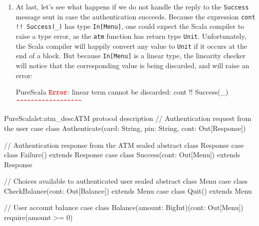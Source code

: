 \documentclass[a4paper,twoside]{article}
\newcommand{\stt}[1]{\texttt{\small{#1}}}
\begin{document}
\begin{enumerate}
\begin{ShortCode}{PureScala}
$\texttt{\textbf{\textcolor{Red}{Error}}}$: linear variable `cont` of $\texttt{type}$ `Linear[OutChan[Response]]` is never used:
                 case Authenticate(_, _, cont) =>
                                         $\texttt{\textbf{\textcolor{Red}{\textasciicircum\textasciicircum\textasciicircum\textasciicircum}}}$
\end{ShortCode}

\item
At last, let's see what happens if we do not handle the reply to the \stt{Success} message sent in case the authentication succeeds. Because the expression \stt{cont !! Success(\_)} has type \stt{In[Menu]}, one could expect the Scala compiler to raise a type error, as the \stt{atm} function has return type \stt{Unit}. Unfortunately, the Scala compiler will happily convert any value to \stt{Unit} if it occurs at the end of a block. But because \stt{In[Menu]} is a linear type, the linearity checker will notice that the corresponding value is being discarded, and will raise an error:

\begin{ShortCode}{PureScala}
$\texttt{\textbf{\textcolor{Red}{Error}}}$: linear term cannot be discarded: cont !! Success(_)
                                        $\texttt{\textbf{\textcolor{Red}{\textasciicircum\textasciicircum\textasciicircum\textasciicircum\textasciicircum\textasciicircum\textasciicircum\textasciicircum\textasciicircum\textasciicircum\textasciicircum\textasciicircum\textasciicircum\textasciicircum\textasciicircum\textasciicircum\textasciicircum\textasciicircum}}}$
\end{ShortCode}
\end{enumerate}

\begin{Code}{PureScala}{lst:atm_desc}{ATM protocol description}
// Authentication request from the user
case class Authenticate(card: String, pin: String, cont: Out[Response])

// Authentication response from the ATM
sealed abstract class Response
case class Failure()                extends Response
case class Success(cont: Out[Menu]) extends Response

// Choices available to authenticated user
sealed abstract class Menu
case class CheckBalance(cont: Out[Balance]) extends Menu
case class Quit()                           extends Menu

// User account balance
case class Balance(amount: BigInt)(cont: Out[Menu]) {
  require(amount >= 0)
}
\end{Code}
\end{document}
